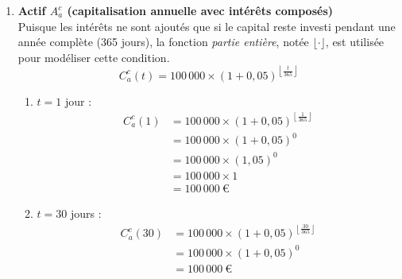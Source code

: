 \documentclass{article}
\begin{document}
\begin{enumerate}[label=\textbf{R2.\arabic*}]
                \item \textbf{Actif \( A_a^c \) (capitalisation annuelle avec intérêts composés)} \\
                    Puisque les intérêts ne sont ajoutés que si le capital reste investi pendant une année complète (365 jours), la fonction \emph{partie entière}, notée $\lfloor \cdot \rfloor$, est utilisée pour modéliser cette condition.
                    \[
                        C_a^c(t) = 100\,000 \times \left(1 + 0,05\right)^{\left\lfloor \frac{t}{365} \right\rfloor}
                    \]
                    \begin{enumerate}[label=(\alph*)]
                        \item \( t = 1 \) jour : 
                        \begin{align*}
                            C_a^c(1) &= 100\,000 \times \left(1 + 0,05\right)^{\left\lfloor \frac{1}{365} \right\rfloor} \\
                            & = 100\,000 \times \left(1 + 0,05 \right)^0                                               \\
                            & = 100\,000 \times (1,05)^0                                                                \\
                            & = 100\,000 \times 1                                                                      \\
                            & = \boxed{100\,000\ \text{€}}                                                           
                        \end{align*}

                        \item \( t = 30 \) jours : 
                        \begin{align*}
                            C_a^c(30) &= 100\,000 \times \left(1 + 0,05\right)^{\left\lfloor \frac{30}{365} \right\rfloor} \\
                            & = 100\,000 \times \left(1 + 0,05 \right)^0  \\
                            & = \boxed{100\,000\ \text{€}}                                                            
                        \end{align*}


\end{enumerate}
\end{enumerate}
\end{document}
